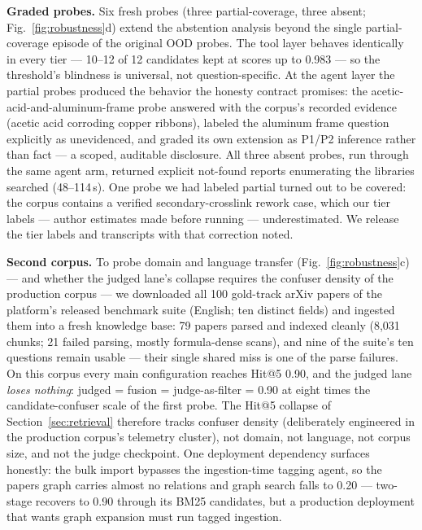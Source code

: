 \textbf{Graded probes.} Six fresh probes (three partial-coverage, three
absent; Fig.~\ref{fig:robustness}d) extend the abstention analysis beyond
the single partial-coverage
episode of the original OOD probes. The tool layer behaves identically in
every tier --- 10--12 of 12
candidates kept at scores up to 0.983 --- so the threshold's blindness is
universal, not question-specific. At the agent layer the partial probes
produced the behavior the honesty contract promises: the
acetic-acid-and-aluminum-frame probe answered with the corpus's recorded
evidence (acetic acid corroding copper ribbons), labeled the aluminum
frame question explicitly as unevidenced, and graded its own extension as
P1/P2 inference rather than fact --- a scoped, auditable disclosure. All
three absent probes, run through the same agent arm, returned explicit
not-found reports enumerating the libraries searched (48--114\,s). One
probe we had labeled partial turned out to be covered: the corpus contains
a verified secondary-crosslink rework case, which our tier labels ---
author estimates made before running --- underestimated. We release the
tier labels and transcripts with that correction noted.

\textbf{Second corpus.} To probe domain and language transfer
(Fig.~\ref{fig:robustness}c) --- and
whether the judged lane's collapse requires the confuser density of the
production corpus --- we downloaded all 100 gold-track arXiv papers of
the platform's released benchmark suite (English; ten distinct fields)
and ingested them into a fresh knowledge base: 79 papers parsed and
indexed cleanly (8{,}031 chunks; 21 failed parsing, mostly
formula-dense scans), and nine of the suite's ten questions remain
usable --- their single shared miss is one of the parse failures. On
this corpus every main configuration reaches Hit@5 0.90, and the judged
lane \emph{loses nothing}: judged = fusion = judge-as-filter = 0.90 at
eight times the candidate-confuser scale of the first probe. The Hit@5
collapse of Section~\ref{sec:retrieval} therefore tracks confuser
density (deliberately engineered in the production corpus's telemetry
cluster), not domain, not language, not corpus size, and not the judge
checkpoint. One deployment dependency surfaces honestly: the bulk
import bypasses the ingestion-time tagging agent, so the papers graph
carries almost no relations and graph search falls to 0.20 ---
two-stage recovers to 0.90 through its BM25 candidates, but a
production deployment that wants graph expansion must run tagged
ingestion.


